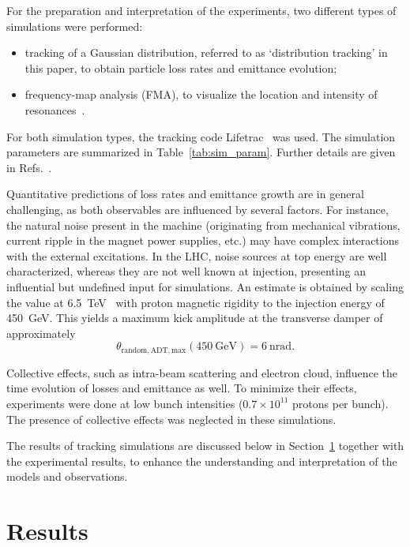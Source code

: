 \documentclass[%
 reprint,
 amsmath,amssymb,
 aps,
prstab,
longbibliography
]{revtex4-1}
\newcommand{\q}[2]{\ensuremath{#1\ \mathrm{#2}}} %
\begin{document}
For the preparation and interpretation of the experiments, two
different types of simulations were performed:
%
\begin{itemize}
\item tracking of a Gaussian distribution, referred to as
  `distribution tracking' in this paper, to obtain particle loss rates
  and emittance evolution;
\item frequency-map analysis (FMA), to visualize the location and
  intensity of resonances~\cite{fmalaskar}.
\end{itemize}
%
For both simulation types, the tracking code Lifetrac~\cite{lifetrac}
was used. The simulation parameters are summarized in
Table~\ref{tab:sim_param}. Further details are given in
Refs.~\cite{md_sim_hel_res_ex_fitterer, resexmd2017}.

Quantitative predictions of loss rates and emittance growth are in
general challenging, as both observables are influenced by several
factors. For instance, the natural noise present in the machine
(originating from mechanical vibrations, current ripple in the magnet
power supplies, etc.) may have complex interactions with the external
excitations. In the LHC, noise sources at top energy are well
characterized, whereas they are not well known at injection,
presenting an influential but undefined input for simulations.  An
estimate is obtained by scaling the value at
6.5~TeV~\cite{md1433_noise_top_energy, md_noise_bbLHC} with proton
magnetic rigidity to the injection energy of 450~GeV. This yields a
maximum kick amplitude at the transverse damper of approximately
%
\begin{equation}
  \label{eq:noise-kick}
  \theta_{\mathrm{random,ADT,max}}(\mathrm{450~GeV}) = \q{6}{nrad}.
\end{equation}

Collective effects, such as intra-beam scattering and electron cloud,
influence the time evolution of losses and emittance as well. To
minimize their effects, experiments were done at low bunch intensities
($0.7 \times 10^{11}$ protons per bunch). The presence of collective
effects was neglected in these simulations.

The results of tracking simulations are discussed below in
Section~\ref{sec:simex} together with the experimental results, to
enhance the understanding and interpretation of the models and
observations.



\section{Results}
\label{sec:simex}
\end{document}
